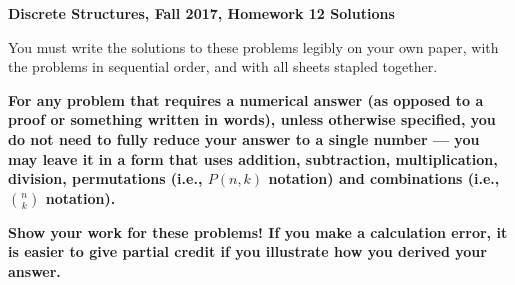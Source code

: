 \documentclass[11pt, letterpaper]{report}
\begin{document}
{\textbf{Discrete Structures, Fall 2017, Homework 12 Solutions}}

\vspace*{.1in}

You must write the solutions to these problems legibly on your own paper, with
the problems in sequential order, and with all sheets stapled together.

\medskip

\textbf{For any problem that requires a numerical answer (as opposed to a proof or something written in words), unless otherwise specified, you do not need to fully reduce your
answer to a single number --- you may leave it in a form that uses addition, subtraction, multiplication, division, permutations (i.e., $P(n,k)$ notation)
and combinations (i.e., $\binom{n}{k}$ notation).}

\medskip

\textbf{Show your work for these problems! If you make a calculation error, it is easier to give partial credit if you illustrate how you derived your answer.}
\end{document}
